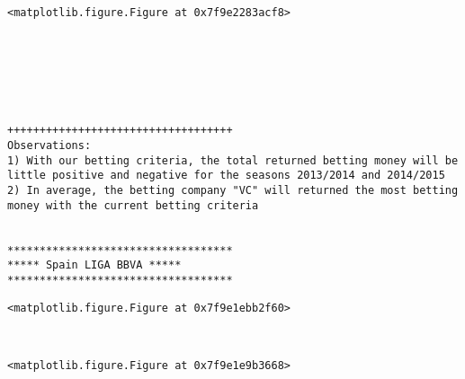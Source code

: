 \documentclass[11pt]{article}
\begin{document}
    
    \begin{verbatim}
<matplotlib.figure.Figure at 0x7f9e2283acf8>
    \end{verbatim}

    
    \begin{center}
    \end{center}
    { \hspace*{\fill} \\}
    
    \begin{center}
    \end{center}
    { \hspace*{\fill} \\}
    
    \begin{center}
    \end{center}
    { \hspace*{\fill} \\}
    
    \begin{Verbatim}[commandchars=\\\{\}]
+++++++++++++++++++++++++++++++++++
Observations: 
1) With our betting criteria, the total returned betting money will be little positive and negative for the seasons 2013/2014 and 2014/2015
2) In average, the betting company "VC" will returned the most betting money with the current betting criteria


***********************************
***** Spain LIGA BBVA *****
***********************************

    \end{Verbatim}

    
    \begin{verbatim}
<matplotlib.figure.Figure at 0x7f9e1ebb2f60>
    \end{verbatim}

    
    \begin{center}
    \end{center}
    { \hspace*{\fill} \\}
    
    
    \begin{verbatim}
<matplotlib.figure.Figure at 0x7f9e1e9b3668>
    \end{verbatim}
\end{document}
